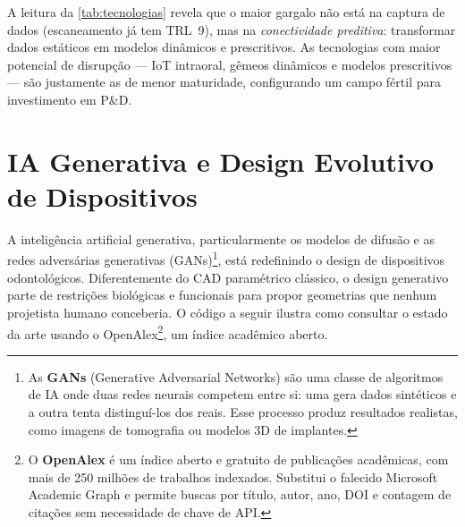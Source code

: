 A leitura da \autoref{tab:tecnologias} revela que o maior gargalo
não está na captura de dados (escaneamento já tem TRL~9), mas na
\emph{conectividade preditiva}: transformar dados estáticos em
modelos dinâmicos e prescritivos. As tecnologias com maior potencial
de disrupção — IoT intraoral, gêmeos dinâmicos e modelos
prescritivos — são justamente as de menor maturidade,
configurando um campo fértil para investimento em P\&D.


\section{IA Generativa e Design Evolutivo de Dispositivos}

A inteligência artificial generativa, particularmente os modelos de
difusão e as redes adversárias generativas (GANs)\footnote{As
\textbf{GANs} (Generative Adversarial Networks) são uma classe de
algoritmos de IA onde duas redes neurais competem entre si: uma
gera dados sintéticos e a outra tenta distinguí-los dos reais. Esse
processo produz resultados realistas, como imagens de tomografia ou
modelos 3D de implantes.}, está redefinindo o design de dispositivos
odontológicos. Diferentemente do CAD paramétrico clássico, o design
generativo parte de restrições biológicas e funcionais para propor
geometrias que nenhum projetista humano conceberia. O código a
seguir ilustra como consultar o estado da arte usando o
OpenAlex\footnote{O \textbf{OpenAlex} é um índice aberto e gratuito
de publicações acadêmicas, com mais de 250 milhões de trabalhos
indexados. Substitui o falecido Microsoft Academic Graph e permite
buscas por título, autor, ano, DOI e contagem de citações sem
necessidade de chave de API.}, um índice acadêmico aberto.

